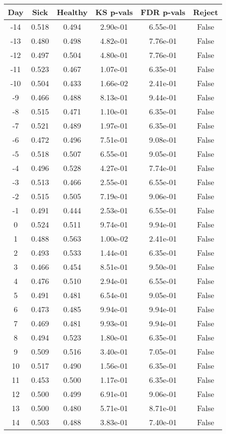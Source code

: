 \begin{tabular}{c|c|c|c|c|c}
Day &  Sick & Healthy &  KS p-vals & FDR p-vals & Reject\\
\hline
-14 & 0.518 &   0.494 &   2.90e-01 &   6.55e-01 &  False\\
-13 & 0.480 &   0.498 &   4.82e-01 &   7.76e-01 &  False\\
-12 & 0.497 &   0.504 &   4.80e-01 &   7.76e-01 &  False\\
-11 & 0.523 &   0.467 &   1.07e-01 &   6.35e-01 &  False\\
-10 & 0.504 &   0.433 &   1.66e-02 &   2.41e-01 &  False\\
 -9 & 0.466 &   0.488 &   8.13e-01 &   9.44e-01 &  False\\
 -8 & 0.515 &   0.471 &   1.10e-01 &   6.35e-01 &  False\\
 -7 & 0.521 &   0.489 &   1.97e-01 &   6.35e-01 &  False\\
 -6 & 0.472 &   0.496 &   7.51e-01 &   9.08e-01 &  False\\
 -5 & 0.518 &   0.507 &   6.55e-01 &   9.05e-01 &  False\\
 -4 & 0.496 &   0.528 &   4.27e-01 &   7.74e-01 &  False\\
 -3 & 0.513 &   0.466 &   2.55e-01 &   6.55e-01 &  False\\
 -2 & 0.515 &   0.505 &   7.19e-01 &   9.06e-01 &  False\\
 -1 & 0.491 &   0.444 &   2.53e-01 &   6.55e-01 &  False\\
  0 & 0.524 &   0.511 &   9.74e-01 &   9.94e-01 &  False\\
  1 & 0.488 &   0.563 &   1.00e-02 &   2.41e-01 &  False\\
  2 & 0.493 &   0.533 &   1.44e-01 &   6.35e-01 &  False\\
  3 & 0.466 &   0.454 &   8.51e-01 &   9.50e-01 &  False\\
  4 & 0.476 &   0.510 &   2.94e-01 &   6.55e-01 &  False\\
  5 & 0.491 &   0.481 &   6.54e-01 &   9.05e-01 &  False\\
  6 & 0.473 &   0.485 &   9.94e-01 &   9.94e-01 &  False\\
  7 & 0.469 &   0.481 &   9.93e-01 &   9.94e-01 &  False\\
  8 & 0.494 &   0.523 &   1.80e-01 &   6.35e-01 &  False\\
  9 & 0.509 &   0.516 &   3.40e-01 &   7.05e-01 &  False\\
 10 & 0.517 &   0.490 &   1.56e-01 &   6.35e-01 &  False\\
 11 & 0.453 &   0.500 &   1.17e-01 &   6.35e-01 &  False\\
 12 & 0.500 &   0.499 &   6.91e-01 &   9.06e-01 &  False\\
 13 & 0.500 &   0.480 &   5.71e-01 &   8.71e-01 &  False\\
 14 & 0.503 &   0.488 &   3.83e-01 &   7.40e-01 &  False\\
\end{tabular}